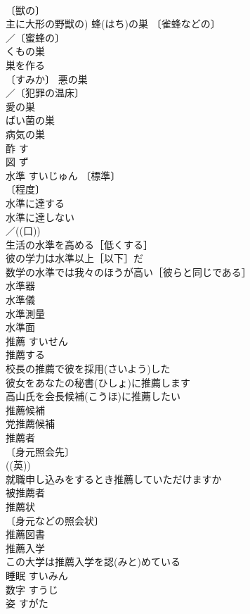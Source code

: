 \documentclass[8pt]{extreport}
\begin{document}
\begin{CJK}{UTF8}{min}
\\	〔獣の〕
\\	主に大形の野獣の) 蜂(はち)の巣 〔雀蜂などの〕
\\	／〔蜜蜂の〕
\\	くもの巣 
\\	巣を作る 
\\	〔すみか〕 悪の巣 
\\	／〔犯罪の温床〕
\\	愛の巣 
\\	ばい菌の巣 
\\	病気の巣 
\\	酢	す	
\\	図	ず	
\\	水準	すいじゅん	〔標準〕
\\	〔程度〕
\\	水準に達する
\\	水準に達しない
\\	／((口)) 
\\	生活の水準を高める［低くする］
\\	彼の学力は水準以上［以下］だ
\\	数学の水準では我々のほうが高い［彼らと同じである］
\\	水準器 
\\	水準儀 
\\	水準測量 
\\	水準面 
\\	推薦	すいせん	
\\	推薦する 
\\	校長の推薦で彼を採用(さいよう)した 
\\	彼女をあなたの秘書(ひしょ)に推薦します 
\\	高山氏を会長候補(こうほ)に推薦したい 
\\	推薦候補 
\\	党推薦候補 
\\	推薦者 
\\	〔身元照会先〕
\\	((英)) 
\\	就職申し込みをするとき推薦していただけますか 
\\	被推薦者 
\\	推薦状 
\\	〔身元などの照会状〕
\\	推薦図書 
\\	推薦入学 
\\	この大学は推薦入学を認(みと)めている 
\\	睡眠	すいみん	
\\	数字	すうじ	
\\	姿	すがた	

\end{CJK}
\end{document}
